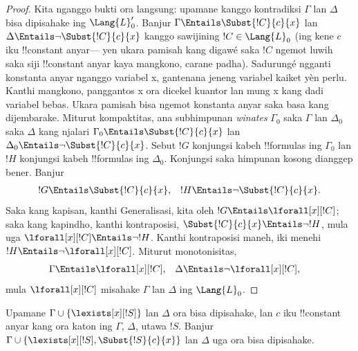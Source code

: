 \documentclass[../../../include/open-logic-section]{subfiles}
\begin{document}
\begin{proof}
Kita nganggo bukti ora langsung: upamane kanggo
kontradiksi $\Gamma$ lan $\Delta$ bisa dipisahake
ing $\Lang{L}'_0$. Banjur $\Gamma \Entails
\Subst{!C}{c}{x}$ lan $\Delta \Entails \lnot
\Subst{!C}{c}{x}$ kanggo sawijining $!C \in
\Lang{L}_0$ (ing kene $c$ iku !!{constant} anyar---
yen ukara pamisah kang digawé saka $!C$
ngemot luwih saka siji
!!{constant} anyar kaya mangkono, carane padha).
Sadurungé ngganti konstanta anyar nganggo variabel x, gantenana jeneng variabel kaiket yèn perlu. Kanthi mangkono, panggantos x ora dicekel kuantor lan mung x kang dadi variabel bebas.
Ukara pamisah bisa ngemot konstanta anyar saka basa kang dijembarake.
Miturut kompaktitas, ana subhimpunan \emph{winates}
$\Gamma_0$ saka $\Gamma$ lan $\Delta_0$ saka
$\Delta$ kang njalari $\Gamma_0 \Entails
\Subst{!C}{c}{x}$ lan $\Delta_0 \Entails
\lnot \Subst{!C}{c}{x}$. Sebut $!G$ konjungsi
kabeh !!{formula}s ing $\Gamma_0$ lan $!H$
konjungsi kabeh !!{formula}s ing $\Delta_0$. Konjungsi saka himpunan kosong dianggep bener.
Banjur
\begin{align*}
  !G & \Entails \Subst{!C}{c}{x}, & !H  \Entails \lnot \Subst{!C}{c}{x}.
\end{align*}
Saka kang kapisan, kanthi Generalisasi, kita oleh
$!G \Entails \lforall[x][!C]$; saka kang kapindho,
kanthi kontraposisi, $\Subst{!C}{c}{x} \Entails
\lnot !H$, mula uga $\lforall[x][!C]
\Entails \lnot !H$. Kanthi kontraposisi maneh,
iki menehi $!H \Entails \lnot \lforall[x][!C]$.
Miturut monotonisitas,
\begin{align*}
  \Gamma &\Entails \lforall[x][!C], & 
  \Delta & \Entails \lnot \lforall[x][!C],
\end{align*}
mula $\lforall[x][!C]$ misahake $\Gamma$
lan $\Delta$ ing $\Lang{L}_0$.
\end{proof}

\begin{lem}
Upamane $\Gamma \cup \{ \lexists[x][!S] \}$
lan $\Delta$ ora bisa dipisahake, lan $c$
iku !!{constant} anyar kang ora katon ing
$\Gamma$, $\Delta$, utawa $!S$. Banjur
$\Gamma \cup \{ \lexists[x][!S],
\Subst{!S}{c}{x} \}$ lan $\Delta$ uga
ora bisa dipisahake.
\end{lem}
\end{document}
